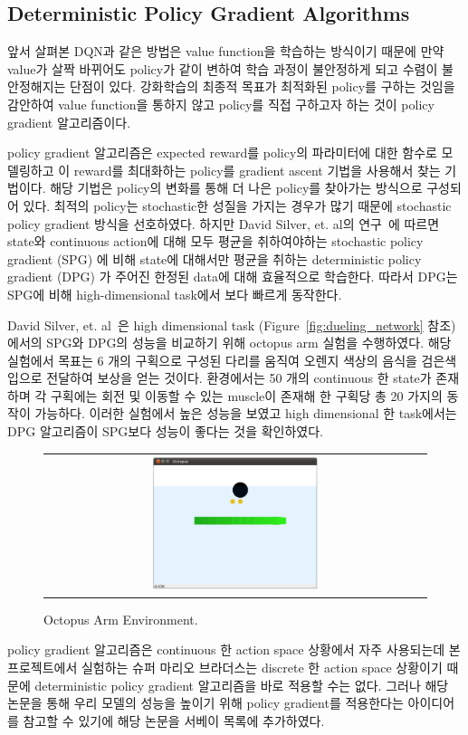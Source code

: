 \subsection{Deterministic Policy Gradient Algorithms}
\label{sec:survey:DPG}
앞서 살펴본 DQN과 같은 방법은 value function을 학습하는 방식이기 때문에 만약 value가 살짝 바뀌어도 policy가 같이 변하여 학습 과정이 불안정하게 되고 수렴이 불안정해지는 단점이 있다.
강화학습의 최종적 목표가 최적화된 policy를 구하는 것임을 감안하여 value function을 통하지 않고 policy를 직접 구하고자 하는 것이 policy gradient 알고리즘이다.

policy gradient 알고리즘은 expected reward를 policy의 파라미터에 대한 함수로 모델링하고 이 reward를 최대화하는 policy를 gradient ascent 기법을 사용해서 찾는 기법이다.
해당 기법은 policy의 변화를 통해 더 나은 policy를 찾아가는 방식으로 구성되어 있다. 
최적의 policy는 stochastic한 성질을 가지는 경우가 많기 때문에 stochastic policy gradient 방식을 선호하였다.
하지만 David Silver, et. al의 연구~\cite{DPG}에 따르면 state와 continuous action에 대해 모두 평균을 취하여야하는 stochastic policy gradient (SPG) 에 비해 state에 대해서만 평균을 취하는 deterministic policy gradient (DPG) 가 주어진 한정된 data에 대해 효율적으로 학습한다.
따라서 DPG는 SPG에 비해 high-dimensional task에서 보다 빠르게 동작한다.

David Silver, et. al~\cite{DPG}은 high dimensional task (Figure~\ref{fig:dueling_network} 참조) 에서의 SPG와 DPG의 성능을 비교하기 위해 octopus arm 실험을 수행하였다.
해당 실험에서 목표는 6 개의 구획으로 구성된 다리를 움직여 오렌지 색상의 음식을 검은색 입으로 전달하여 보상을 얻는 것이다.
환경에서는 50 개의 continuous 한 state가 존재하며 각 구획에는 회전 및 이동할 수 있는 muscle이 존재해 한 구획당 총 20 가지의 동작이 가능하다. 
이러한 실험에서 높은 성능을 보였고 high dimensional 한 task에서는 DPG 알고리즘이 SPG보다 성능이 좋다는 것을 확인하였다.

\begin{figure}[h]
\begin{center}
\begin{tabular}{c}
     \includegraphics[width=0.45\textwidth]{FIG/OctopusArm.png} \\
\end{tabular}
\caption{
	Octopus Arm Environment.
}
\label{fig:octopus_arm}
\end{center}
\end{figure}

policy gradient 알고리즘은 continuous 한 action space 상황에서 자주 사용되는데 본 프로젝트에서 실험하는 슈퍼 마리오 브라더스는 discrete 한 action space 상황이기 때문에 deterministic policy gradient 알고리즘을 바로 적용할 수는 없다. 
그러나 해당 논문을 통해 우리 모델의 성능을 높이기 위해 policy gradient를 적용한다는 아이디어를 참고할 수 있기에 해당 논문을 서베이 목록에 추가하였다.
